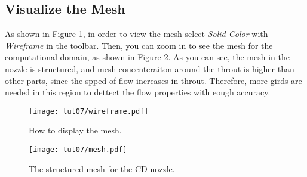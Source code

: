 \subsection{Visualize the Mesh}
As shown in Figure \ref{fig7:wireframe}, in order to view the mesh select \textit{Solid Color} with \textit{Wireframe} in the toolbar. Then, you can zoom in to see the mesh for the computational domain, as shown in Figure \ref{fig7:mesh}. As you can see, the mesh in the nozzle is structured, and mesh concenteraiton around the throut is higher than other parts, since the spped of flow increases in throut. Therefore, more girds are needed in this region to dettect the flow properties with eough accuracy.
\begin{figure}[ht]
	\centering
	\texttt{[image: tut07/wireframe.pdf]}
	\caption{How to display the mesh.}
	\label{fig7:wireframe}
\end{figure}
\begin{figure}[ht]
	\centering
	\texttt{[image: tut07/mesh.pdf]}
	\caption{The structured mesh for the CD nozzle.}
	\label{fig7:mesh}
\end{figure}

